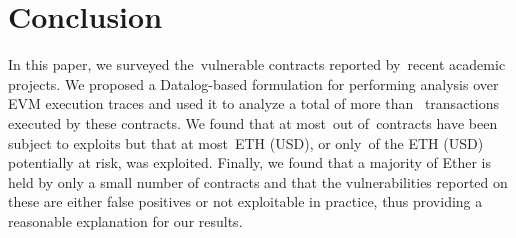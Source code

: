 \section{Conclusion}
\label{sec:conclusion}

In this paper, we surveyed the~\VulnerableContracts vulnerable contracts reported by~\PapersAnalyzed recent academic projects. We proposed a Datalog-based formulation for performing analysis over EVM execution traces and used it to analyze a total of more than~ transactions executed by these contracts. We found that at most~\NumExploitedContracts out of~\VulnerableContracts contracts have been subject to exploits but that at most~\ExploitedEther ETH (\ExploitedEtherUSD USD), or only~\PercentExploitedEther of the \EtherClaimedVulnerable ETH (\EtherClaimedVulnerableUSD USD) potentially at risk, was exploited.
Finally, we found that a majority of Ether is held by only a small number of contracts and that the vulnerabilities reported on these are either false positives or not exploitable in practice, thus providing a reasonable explanation for our results.

